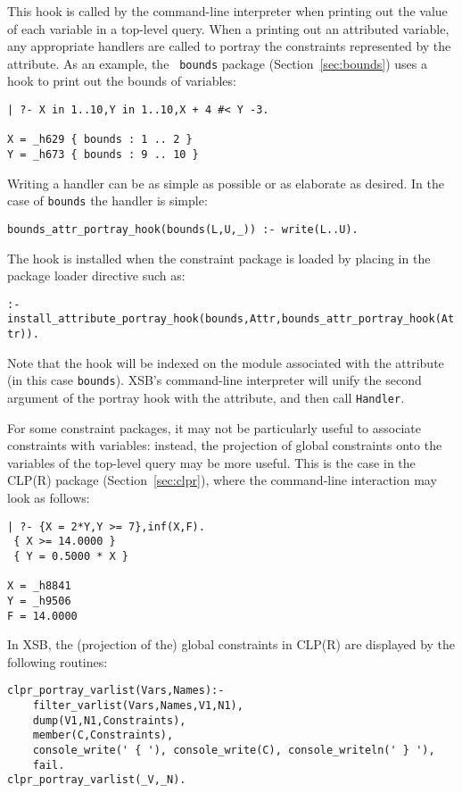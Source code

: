 \begin{description}

%
This hook is called by the command-line interpreter when printing out
the value of each variable in a top-level query.  When a printing out
an attributed variable, any appropriate handlers are called to portray
the constraints represented by the attribute.  As an example, the {\tt
  bounds} package (Section~\ref{sec:bounds}) uses a hook to print out
the bounds of variables:
%
\begin{small}
\begin{verbatim}
| ?- X in 1..10,Y in 1..10,X + 4 #< Y -3.

X = _h629 { bounds : 1 .. 2 }
Y = _h673 { bounds : 9 .. 10 }
\end{verbatim}
\end{small}
%
Writing a handler can be as simple as possible or as elaborate as
desired.  In the case of {\tt bounds} the handler is simple:

{\small
{\tt bounds\_attr\_portray\_hook(bounds(L,U,\_)) :- write(L..U).}
}

The hook is installed when the constraint package is loaded by placing
in the package loader directive such as:

{\small
{\tt  :- install\_attribute\_portray\_hook(bounds,Attr,bounds\_attr\_portray\_hook(Attr)).}
}

Note that the hook will be indexed on the module associated with the
attribute (in this case {\tt bounds}).  XSB's command-line interpreter
will unify the second argument of the portray hook with the attribute,
and then call {\tt Handler}.

%
For some constraint packages, it may not be particularly useful to
associate constraints with variables: instead, the projection of
global constraints onto the variables of the top-level query may be
more useful.  This is the case in the CLP(R) package
(Section~\ref{sec:clpr}), where the command-line interaction may look as follows:
%
{\small
\begin{verbatim}
| ?- {X = 2*Y,Y >= 7},inf(X,F).
 { X >= 14.0000 }
 { Y = 0.5000 * X }

X = _h8841
Y = _h9506
F = 14.0000
\end{verbatim}
}
%
In XSB, the (projection of the) global constraints in CLP(R) are
displayed by the following routines:
%
{\small
\begin{verbatim}
clpr_portray_varlist(Vars,Names):- 
	filter_varlist(Vars,Names,V1,N1),
	dump(V1,N1,Constraints),
	member(C,Constraints),
	console_write(' { '), console_write(C),	console_writeln(' } '),
	fail.
clpr_portray_varlist(_V,_N).


\end{verbatim}}
\end{description}
